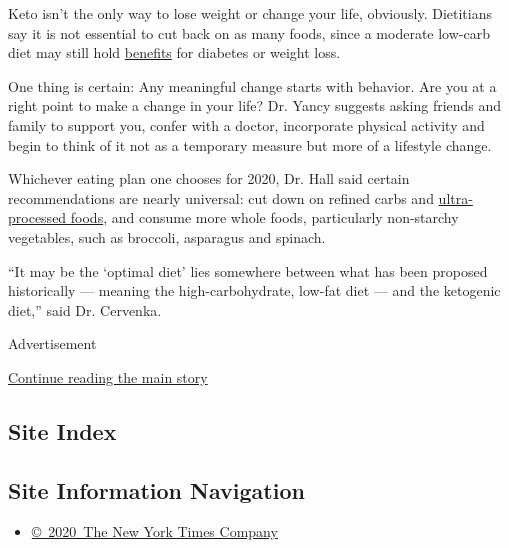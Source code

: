 Keto isn't the only way to lose weight or change your life, obviously.
Dietitians say it is not essential to cut back on as many foods, since a
moderate low-carb diet may still hold
\href{https://doi.org/10.1038/s41430-017-0019-4}{benefits} for diabetes
or weight loss.

One thing is certain: Any meaningful change starts with behavior. Are
you at a right point to make a change in your life? Dr. Yancy suggests
asking friends and family to support you, confer with a doctor,
incorporate physical activity and begin to think of it not as a
temporary measure but more of a lifestyle change.

Whichever eating plan one chooses for 2020, Dr. Hall said certain
recommendations are nearly universal: cut down on refined carbs and
\href{https://www.cell.com/cell-metabolism/fulltext/S1550-4131(19)30248-7?_returnURL=https\%3A\%2F\%2Flinkinghub.elsevier.com\%2Fretrieve\%2Fpii\%2FS1550413119302487\%3Fshowall\%3Dtrue}{ultra-processed
foods}, and consume more whole foods, particularly non-starchy
vegetables, such as broccoli, asparagus and spinach.

``It may be the `optimal diet' lies somewhere between what has been
proposed historically --- meaning the high-carbohydrate, low-fat diet
--- and the ketogenic diet,'' said Dr. Cervenka.

Advertisement

\protect\hyperlink{after-bottom}{Continue reading the main story}

\hypertarget{site-index}{%
\subsection{Site Index}\label{site-index}}

\hypertarget{site-information-navigation}{%
\subsection{Site Information
Navigation}\label{site-information-navigation}}

\begin{itemize}
\tightlist
\item
  \href{https://help.nytimes3xbfgragh.onion/hc/en-us/articles/115014792127-Copyright-notice}{©~2020~The
  New York Times Company}
\end{itemize}

